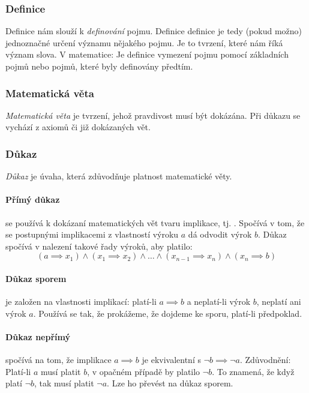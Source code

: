 \documentclass[12pt]{article}
\begin{document}
\subsubsection{Definice}
Definice nám slouží k \emph{definování} pojmu. Definice definice je tedy (pokud možno) jednoznačné určení významu nějakého pojmu. Je to tvrzení, které nám říká význam slova. V matematice: Je definice vymezení pojmu pomocí základních pojmů nebo pojmů, které byly definovány předtím.
\subsubsection{Matematická věta}
\emph{Matematická věta} je tvrzení, jehož pravdivost musí být dokázána. Při důkazu se vychází z axiomů či již dokázaných vět.
\subsubsection{Důkaz}
\emph{Důkaz} je úvaha, která zdůvodňuje platnost matematické věty.
\paragraph{Přímý důkaz} se používá k dokázaní matematických vět tvaru implikace, tj. . Spočívá v tom, že se postupnými implikacemi z vlastností výroku $a$ dá odvodit výrok $b$. Důkaz spočívá v nalezení takové řady výroků, aby platilo:
\begin{equation}
 (a\implies x_{1})\land (x_{1}\implies x_{2})\land \dotso \land (x_{n-1}\implies x_{n})\land (x_{n}\implies b)
\end{equation}
\paragraph{Důkaz sporem} je založen na vlastnosti implikací: platí-li $a \implies b$ a neplatí-li výrok $b$, neplatí ani výrok $a$. Používá se tak, že prokážeme, že dojdeme ke sporu, platí-li předpoklad.
\paragraph{Důkaz nepřímý} spočívá na tom, že implikace $ a \implies b$ je ekvivalentní s $\neg b \implies \neg a$. Zdůvodnění: Platí-li $a$ musí platit $b$, v opačném případě by platilo $\neg b$. To znamená, že když platí $\neg b$, tak musí platit $\neg a$. Lze ho převést na důkaz sporem.
\end{document}
